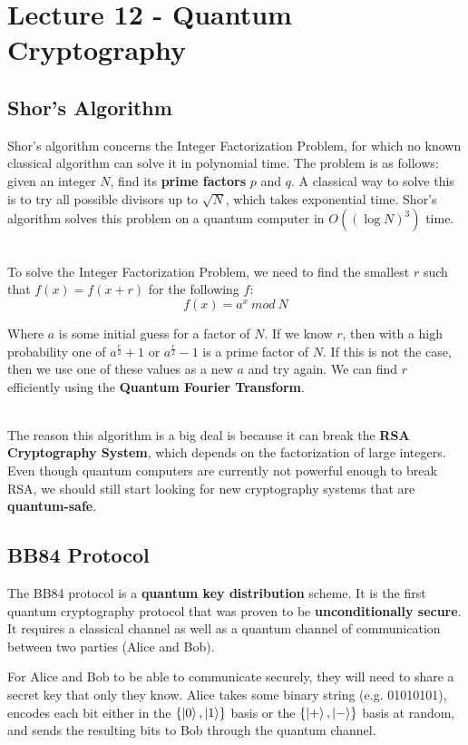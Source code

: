 \documentclass[12pt]{article}
\begin{document}
%
%
\section*{Lecture 12 - Quantum Cryptography}
\subsection*{Shor's Algorithm}
Shor's algorithm concerns the Integer Factorization Problem, for which no known classical algorithm can solve it in polynomial time.
The problem is as follows: given an integer $N$, find its \textbf{prime factors} $p$ and $q$.
A classical way to solve this is to try all possible divisors up to $\sqrt{N}$, which takes exponential time.
Shor's algorithm solves this problem on a quantum computer in $O\left( \left( \log N \right)^3 \right)$ time.

\noindent
\\
To solve the Integer Factorization Problem, we need to find the smallest $r$ such that $f(x) = f(x + r)$ for the following $f$:
\[ f(x) = a^x \ mod \ N \]

\noindent
Where $a$ is some initial guess for a factor of $N$.
If we know $r$, then with a high probability one of $a^{\frac{r}{2}} + 1$ or $a^{\frac{r}{2}} - 1$ is a prime factor of $N$.
If this is not the case, then we use one of these values as a new $a$ and try again.
We can find $r$ efficiently using the \textbf{Quantum Fourier Transform}.

\noindent
\\
The reason this algorithm is a big deal is because it can break the \textbf{RSA Cryptography System}, which depends on the factorization of large integers.
Even though quantum computers are currently not powerful enough to break RSA, we should still start looking for new cryptography systems that are \textbf{quantum-safe}.

\subsection*{BB84 Protocol}
The BB84 protocol is a \textbf{quantum key distribution} scheme.
It is the first quantum cryptography protocol that was proven to be \textbf{unconditionally secure}.
It requires a classical channel as well as a quantum channel of communication between two parties (Alice and Bob).

\newpage
\noindent
For Alice and Bob to be able to communicate securely, they will need to share a secret key that only they know.
Alice takes some binary string (e.g. 01010101), encodes each bit either in the $\{ \ket{0}, \ket{1} \}$ basis or the $\{ \ket{+}, \ket{-} \}$ basis at random, and sends the resulting bits to Bob through the quantum channel.
\end{document}
